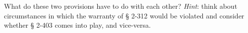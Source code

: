 
\item What do these two provisions have to do with each other? \textit{Hint}:
think about circumstances in which the warranty of {\S} 2-312 would be violated
and consider whether {\S} 2-403 comes into play, and vice-versa.

